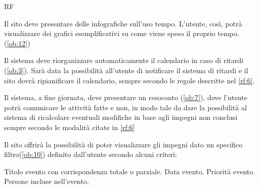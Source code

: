 \begin {listaPersonale}{RF}

Il sito deve presentare delle infografiche sull'uso tempo. L'utente, così, potrà
visualizzare dei grafici esemplificativi su come viene speso il proprio tempo. 
(\ref{ob:12})

Il sistema deve riorganizzare automaticamente il calendario in caso di ritardi (\ref{ob:3}). Sarà data la possibilità all'utente di notificare il sistema di ritardi e il sito dovrà ripianificare il calendario, sempre secondo le regole descritte nel \ref{rf:6}.

Il sistema, a fine giornata, deve presentare un resoconto (\ref{ob:7}), dove l'utente potrà
comunicare le attività fatte e non, in modo tale da dare la possibilità al sistema di 
ricalcolare eventuali modifiche in base agli impegni non conclusi sempre secondo le modalità citate in \ref{rf:6}

Il sito offrirà la possibilità di poter visualizzare gli impegni dato un specifico filtro(\ref{ob:10}) definito dall’utente secondo alcuni criteri: 
\begin{listaPersonale2}
 Titolo evento con corrispondenza totale o parziale.
 Data evento.
 Priorità evento.
 Persone incluse nell’evento.
\end{listaPersonale2}
\end{listaPersonale}